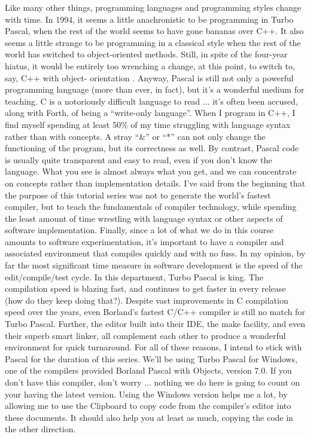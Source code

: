 Like many other things, programming languages and programming styles change with time. In 1994, it seems a little anachronistic to be programming in Turbo Pascal, when the rest of the world seems  to have gone bananas over C++. It also seems a little strange to be programming in a classical style when the rest of the world has switched to object-oriented methods. Still, in spite of the four-year hiatus, it would be entirely too wrenching a change, at this point, to switch to, say, C++ with object- orientation . Anyway, Pascal is still not only a powerful programming language (more than ever, in fact), but it's a wonderful medium for teaching. C is a notoriously difficult language to read ... it's often been accused, along with Forth, of being a ``write-only language''.  When I program in C++, I find myself spending at least 50\% of my time struggling with language syntax rather than with concepts. A stray ``\&'' or ``*'' can not only change the functioning of the program, but its correctness as well. By contrast, Pascal code is usually quite transparent and easy to read, even if you don't know the language. What you see is almost always what you get, and we can concentrate on concepts rather than implementation details. I've said from the beginning that the purpose of this tutorial series was not to generate the world's fastest compiler, but to teach the fundamentals of compiler technology, while spending the least amount of time wrestling with language syntax or other aspects of software implementation. Finally, since a lot of what we do in this course amounts to software experimentation, it's important to have a compiler and associated environment that compiles quickly and with no fuss. In my opinion, by far the most significant time measure in software development is the speed of the edit/compile/test cycle. In this department, Turbo Pascal is king. The compilation speed is blazing fast, and continues to get faster in every release (how do they keep doing that?). Despite vast improvements in C compilation speed over the years, even Borland's fastest C/C++ compiler is still no match for Turbo Pascal. Further, the editor built into their IDE, the make facility, and even their superb smart linker, all complement each other to produce a wonderful environment for quick turnaround. For all of these reasons, I intend to stick with Pascal for the duration of this series. We'll be using Turbo Pascal for Windows, one of the compilers provided Borland Pascal with Objects, version 7.0. If you don't have this compiler, don't worry ... nothing we do here is going to count on your having the latest version. Using the Windows version helps me a lot, by allowing me to use the Clipboard to copy code from the compiler's editor into these documents. It should also help you at least as much, copying the code in the other direction.

